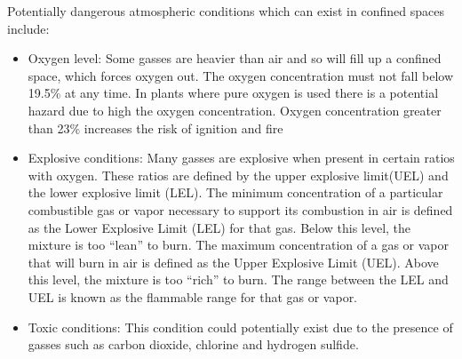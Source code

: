 Potentially dangerous atmospheric conditions which can exist in confined spaces include: 
\begin{itemize}
\item Oxygen level: Some gasses are heavier than air and so will fill up a confined space, which forces oxygen out.  The oxygen concentration must not fall below 19.5\% at any time.  In plants where pure oxygen is used there is a potential hazard due to high the oxygen concentration.  Oxygen concentration greater than 23\% increases the risk of ignition and fire
\item Explosive conditions:  Many gasses are explosive when present in certain ratios with oxygen. These ratios are defined by the upper explosive limit(UEL) and the lower explosive limit (LEL).  The minimum concentration of a particular combustible gas or vapor necessary to support its combustion in air is defined as the Lower Explosive Limit (LEL) for that gas. Below this level, the mixture is too “lean” to burn. The maximum concentration of a gas
or vapor that will burn in air is defined as the Upper Explosive Limit (UEL). Above this level, the mixture is too “rich” to burn.  The range between the LEL and UEL is known as the flammable range for that gas or vapor.  
\item Toxic conditions:  This condition could potentially exist due to the presence of gasses such as carbon dioxide, chlorine and hydrogen sulfide.  
\end{itemize}




